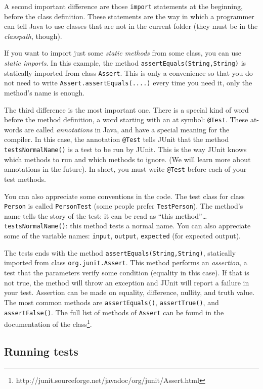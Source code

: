A second important difference are those \verb+import+ statements at
the beginning, before the class definition. These  statements
are the way in which a programmer can tell Java to use classes that
are not in the current folder (they must be in the \emph{classpath},
though). 

If you want to import just some \emph{static methods} from some
class, you can use \emph{static imports}. In this example, the method
\verb+assertEquals(String,String)+ is statically imported from class
\verb+Assert+. This is only a convenience so that you do not need to
write \verb+Assert.assertEquals(....)+ every time you need it, 
only the method's name is enough. 

The third difference is the most important one. There is a special
kind of word before the method definition, a word starting with an at
symbol: \verb+@Test+. These at-words are called \emph{annotations} in
Java, and have a special meaning for the compiler. In this case, the
annotation \verb+@Test+ tells JUnit that the method
\verb+testsNormalName()+ is a test to be run by JUnit. This is the way
JUnit knows which methods to run and which methods to ignore. (We will
learn more about annotations in the future). In short, you must
write \verb+@Test+ before each of your test methods. 

You can also appreciate some conventions in the code. The test class
for class \verb+Person+ is called \verb+PersonTest+ (some people
prefer \verb+TestPerson+). The method's name tells the story of
the test: it can be read as ``this method''\ldots \verb+testsNormalName()+:
this method tests a normal name. You can also appreciate some of the
variable names: \verb+input+, \verb+output+, \verb+expected+ (for
expected output). 

The tests ends with the method \verb+assertEquals(String,String)+,
statically imported from class \verb+org.junit.Assert+. This method performs an
\emph{assertion}, a test that the parameters verify some condition
(equality in this case). If that is not true, the method will throw an
exception and JUnit will report a failure in your test. Assertion can
be made on equality, difference, nullity, and truth value. The most
common methods are \verb+assertEquals()+, \verb+assertTrue()+, and
\verb+assertFalse()+. The full list
of methods of \verb+Assert+ can be found in the documentation of the
class\footnote{http://junit.sourceforge.net/javadoc/org/junit/Assert.html}. 

\subsection{Running tests}
\label{sec:running-tests}


